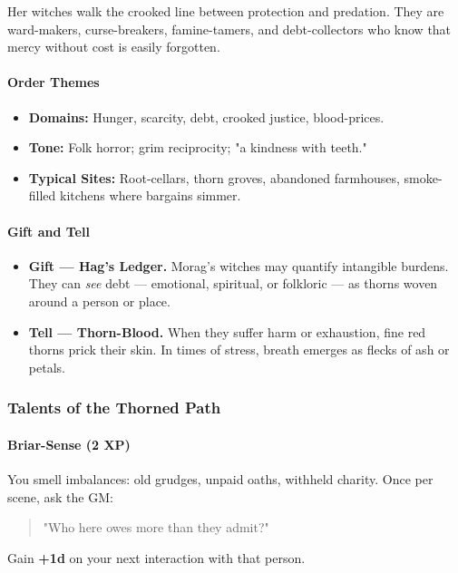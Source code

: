 \documentclass[11pt]{book}
\begin{document}
Her witches walk the crooked line between protection and predation. They are ward-makers, curse-breakers, famine-tamers, and debt-collectors who know that mercy without cost is easily forgotten.

\paragraph{Order Themes}
\begin{itemize}[leftmargin=*]
    \item \textbf{Domains:} Hunger, scarcity, debt, crooked justice, blood-prices.
    \item \textbf{Tone:} Folk horror; grim reciprocity; "a kindness with teeth."
    \item \textbf{Typical Sites:} Root-cellars, thorn groves, abandoned farmhouses, smoke-filled kitchens where bargains simmer.
\end{itemize}

\paragraph{Gift and Tell}
\begin{itemize}[leftmargin=*]
    \item \textbf{Gift --- Hag's Ledger.} Morag's witches may quantify intangible burdens. They can \emph{see} debt --- emotional, spiritual, or folkloric --- as thorns woven around a person or place.
    \item \textbf{Tell --- Thorn-Blood.} When they suffer harm or exhaustion, fine red thorns prick their skin. In times of stress, breath emerges as flecks of ash or petals.
\end{itemize}

\subsubsection{Talents of the Thorned Path}

\paragraph{Briar-Sense (2 XP)}
You smell imbalances: old grudges, unpaid oaths, withheld charity.  
Once per scene, ask the GM:
\begin{quote}
    "Who here owes more than they admit?"
\end{quote}
Gain \textbf{+1d} on your next interaction with that person.
\end{document}
